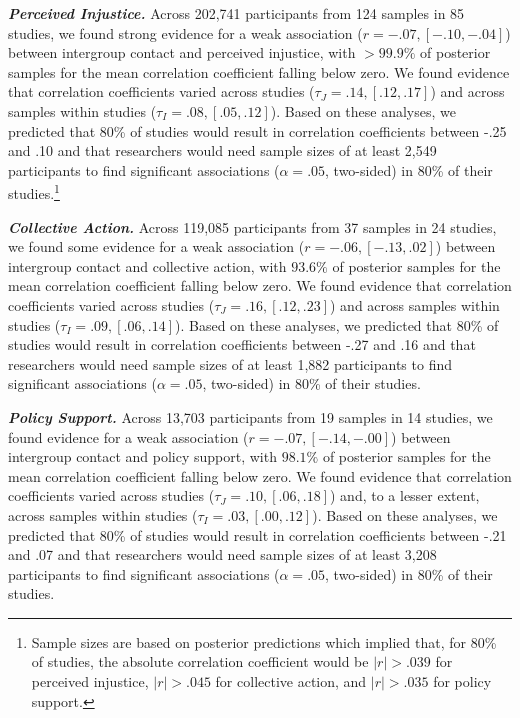 \documentclass[12pt, letterpaper]{article}
\begin{document}
\textbf{\emph{Perceived Injustice.}} Across 202,741 participants from
124 samples in 85 studies, we found strong evidence for a weak
association (\(r = -.07, [-.10, -.04]\)) between intergroup contact and
perceived injustice, with \(>99.9\%\) of posterior samples for the mean
correlation coefficient falling below zero. We found evidence that
correlation coefficients varied across studies
(\(\tau_J = .14, [.12, .17]\)) and across samples within studies
(\(\tau_I = .08, [.05, .12]\)). Based on these analyses, we predicted
that 80\% of studies would result in correlation coefficients between
-.25 and .10 and that researchers would need sample sizes of at least
2,549 participants to find significant associations (\(\alpha = .05\),
two-sided) in 80\% of their studies.\footnote{Sample sizes are based on
  posterior predictions which implied that, for 80\% of studies, the
  absolute correlation coefficient would be \(|r| > .039\) for perceived
  injustice, \(|r| > .045\) for collective action, and \(|r| > .035\)
  for policy support.}

\textbf{\emph{Collective Action.}} Across 119,085 participants from 37
samples in 24 studies, we found some evidence for a weak association
(\(r = -.06, [-.13, .02]\)) between intergroup contact and collective
action, with \(93.6\%\) of posterior samples for the mean correlation
coefficient falling below zero. We found evidence that correlation
coefficients varied across studies (\(\tau_J = .16, [.12, .23]\)) and
across samples within studies (\(\tau_I = .09, [.06, .14]\)). Based on
these analyses, we predicted that 80\% of studies would result in
correlation coefficients between -.27 and .16 and that researchers would
need sample sizes of at least 1,882 participants to find significant
associations (\(\alpha = .05\), two-sided) in 80\% of their studies.

\textbf{\emph{Policy Support.}} Across 13,703 participants from 19
samples in 14 studies, we found evidence for a weak association
(\(r = -.07, [-.14, -.00]\)) between intergroup contact and policy
support, with \(98.1\%\) of posterior samples for the mean correlation
coefficient falling below zero. We found evidence that correlation
coefficients varied across studies (\(\tau_J = .10, [.06, .18]\)) and,
to a lesser extent, across samples within studies
(\(\tau_I = .03, [.00, .12]\)). Based on these analyses, we predicted
that 80\% of studies would result in correlation coefficients between
-.21 and .07 and that researchers would need sample sizes of at least
3,208 participants to find significant associations (\(\alpha = .05\),
two-sided) in 80\% of their studies.
\end{document}
